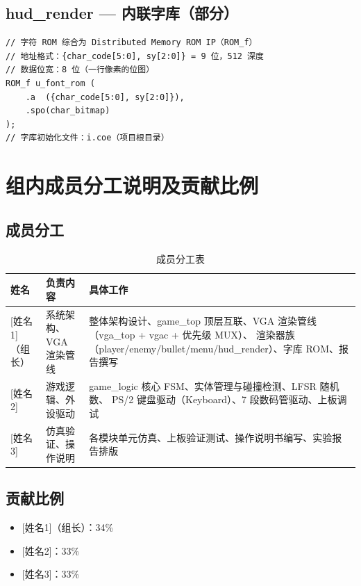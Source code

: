 \documentclass[12pt,a4paper]{ctexart}
\begin{document}
\subsection{hud\_render --- 内联字库（部分）}

\begin{lstlisting}
// 字符 ROM 综合为 Distributed Memory ROM IP（ROM_f）
// 地址格式：{char_code[5:0], sy[2:0]} = 9 位，512 深度
// 数据位宽：8 位（一行像素的位图）
ROM_f u_font_rom (
    .a  ({char_code[5:0], sy[2:0]}),
    .spo(char_bitmap)
);
// 字库初始化文件：i.coe（项目根目录）
\end{lstlisting}


\section{组内成员分工说明及贡献比例}

\subsection{成员分工}


\begin{table}[H]
\centering
\caption{成员分工表}
\label{tab:division}
\begin{tabular}{lp{4.5cm}p{5cm}}
\toprule
\textbf{姓名} & \textbf{负责内容} & \textbf{具体工作} \\
\midrule
{[姓名1]}（组长） & 系统架构、VGA 渲染管线 &
    整体架构设计、game\_top 顶层互联、VGA 渲染管线（vga\_top + vgac + 优先级 MUX）、
    渲染器族（player/enemy/bullet/menu/hud\_render）、字库 ROM、报告撰写 \\
\midrule
{[姓名2]} & 游戏逻辑、外设驱动 &
    game\_logic 核心 FSM、实体管理与碰撞检测、LFSR 随机数、
    PS/2 键盘驱动（Keyboard）、7 段数码管驱动、上板调试 \\
\midrule
{[姓名3]} & 仿真验证、操作说明 &
    各模块单元仿真、上板验证测试、操作说明书编写、实验报告排版 \\
\bottomrule
\end{tabular}
\end{table}

\subsection{贡献比例}

\begin{itemize}
    \item {[姓名1]}（组长）：34\%
    \item {[姓名2]}：33\%
    \item {[姓名3]}：33\%
\end{itemize}
\end{document}
